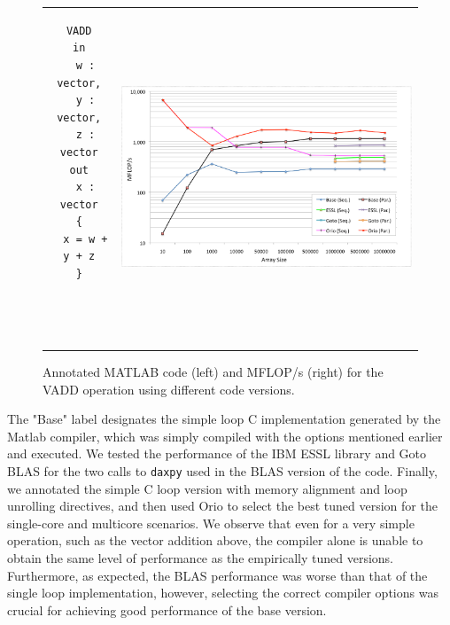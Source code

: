 \documentclass[runningheads]{llncs}
\begin{document}
\begin{figure}[htp]
\centering
\begin{tabular}{cc}
\begin{minipage}[b]{.25\textwidth}
\footnotesize
\begin{verbatim}
VADD
in
  w : vector,
  y : vector,
  z : vector
out
  x : vector
{
  x = w + y + z
}




\end{verbatim}
\end{minipage}
&
\begin{minipage}[b]{.6\textwidth}
\includegraphics[width=1.0\textwidth]{figures/vadd_bgp.eps}
\end{minipage}\\
\end{tabular}
\caption{Annotated MATLAB code (left) and MFLOP/s (right) for the VADD operation using different code versions.}
\label{fig:vadd}
\end{figure}

The "Base" label designates the simple loop C implementation generated by the Matlab compiler, which was simply compiled with the options mentioned earlier and executed. We tested the performance of the IBM ESSL library and Goto BLAS for the two calls to \texttt{daxpy} used in the BLAS version of the code. Finally, we annotated the simple C loop version with memory alignment and loop unrolling directives, and then used Orio to select the best tuned version for the single-core and multicore scenarios. We observe that even for a very simple operation, such as the vector addition above, the compiler alone is unable to obtain the same level of performance as the empirically tuned versions. Furthermore, as expected, the BLAS performance was worse than that of the single loop implementation, however, selecting the correct compiler options was crucial for achieving good performance of the base version.
\end{document}
